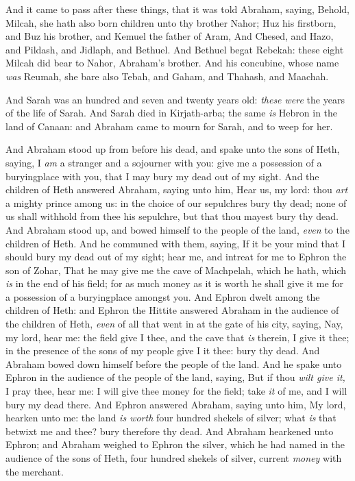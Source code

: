 \documentclass[11pt,letterpaper,oneside]{memoir}
\begin{document}
And it came to pass after these things, that it was told Abraham,
saying, Behold, Milcah, she hath also born children unto thy brother
Nahor; Huz his firstborn, and Buz his brother, and Kemuel the father of
Aram, And Chesed, and Hazo, and Pildash, and Jidlaph, and Bethuel. And
Bethuel begat Rebekah: these eight Milcah did bear to Nahor, Abraham's
brother. And his concubine, whose name \emph{was} Reumah, she bare also
Tebah, and Gaham, and Thahash, and Maachah.

And Sarah was an hundred and seven and twenty years old: \emph{these
were} the years of the life of Sarah. And Sarah died in Kirjath-arba;
the same \emph{is} Hebron in the land of Canaan: and Abraham came to
mourn for Sarah, and to weep for her.

And Abraham stood up from before his dead, and spake unto the sons of
Heth, saying, I \emph{am} a stranger and a sojourner with you: give me a
possession of a buryingplace with you, that I may bury my dead out of my
sight. And the children of Heth answered Abraham, saying unto him, Hear
us, my lord: thou \emph{art} a mighty prince among us: in the choice of
our sepulchres bury thy dead; none of us shall withhold from thee his
sepulchre, but that thou mayest bury thy dead. And Abraham stood up, and
bowed himself to the people of the land, \emph{even} to the children of
Heth. And he communed with them, saying, If it be your mind that I
should bury my dead out of my sight; hear me, and intreat for me to
Ephron the son of Zohar, That he may give me the cave of Machpelah,
which he hath, which \emph{is} in the end of his field; for as much
money as it is worth he shall give it me for a possession of a
buryingplace amongst you. And Ephron dwelt among the children of Heth:
and Ephron the Hittite answered Abraham in the audience of the children
of Heth, \emph{even} of all that went in at the gate of his city,
saying, Nay, my lord, hear me: the field give I thee, and the cave that
\emph{is} therein, I give it thee; in the presence of the sons of my
people give I it thee: bury thy dead. And Abraham bowed down himself
before the people of the land. And he spake unto Ephron in the audience
of the people of the land, saying, But if thou \emph{wilt give it,} I
pray thee, hear me: I will give thee money for the field; take \emph{it}
of me, and I will bury my dead there. And Ephron answered Abraham,
saying unto him, My lord, hearken unto me: the land \emph{is worth} four
hundred shekels of silver; what \emph{is} that betwixt me and thee? bury
therefore thy dead. And Abraham hearkened unto Ephron; and Abraham
weighed to Ephron the silver, which he had named in the audience of the
sons of Heth, four hundred shekels of silver, current \emph{money} with
the merchant.
\end{document}
